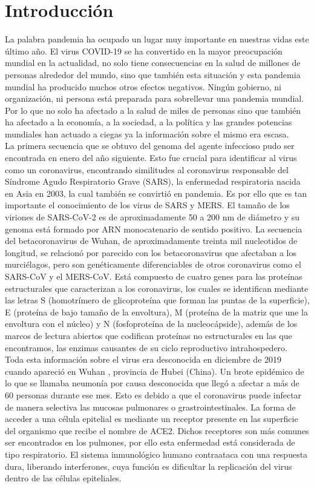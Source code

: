 \documentclass{article}
\begin{document}
\section{Introducción}
		La palabra pandemia ha ocupado un lugar muy importante en nuestras vidas este último año. El virus COVID-19 se ha convertido en la mayor preocupación mundial en la actualidad, no solo tiene consecuencias en la salud de millones de personas alrededor del mundo, sino que también esta situación y esta pandemia mundial ha producido muchos otros efectos negativos. Ningún gobierno, ni organización, ni persona está preparada para sobrellevar una pandemia mundial. Por lo que no solo ha afectado a la salud de miles de personas sino que también ha afectado a la economía, a la sociedad, a la política y las grandes potencias mundiales han actuado a ciegas ya la información sobre el mismo era escasa.\\
		
		\noindent La primera secuencia que se obtuvo del genoma del agente infeccioso pudo ser encontrada en enero del año siguiente. Esto fue crucial para identificar al virus como un coronavirus, encontrando similitudes al coronavirus responsable del Síndrome Agudo Respiratorio Grave (SARS), la enfermedad respiratoria nacida en Asia en 2003, la cual también se convirtió en pandemia. Es por ello que es tan importante el conocimiento de los virus de SARS y MERS. El tamaño de los viriones de SARS-CoV-2 es de aproximadamente 50 a 200 nm de diámetro y su genoma está formado por ARN monocatenario de sentido positivo. La secuencia del betacoronavirus de Wuhan, de aproximadamente treinta mil nucleotidos de longitud, se relacionó por parecido con los betacoronavirus que afectaban a los murciélagos, pero son genéticamente diferenciables de otros coronavirus como el SARS-CoV y el MERS-CoV.  Está compuesto de cuatro genes para las proteínas estructurales que caracterizan a los coronavirus, los cuales se identifican mediante las letras S (homotrímero de glicoproteína que forman las puntas de la superficie), E (proteína de bajo tamaño de la envoltura), M (proteína de la matriz que une la envoltura con el núcleo) y N (fosfoproteína de la nucleocápside), además de los marcos de lectura abiertos que codifican proteínas no estructurales en las que encontramos, las enzimas causantes de su ciclo reproductivo intrahospedero. \\
		
		\noindent Toda esta información sobre el virus era desconocida en diciembre de 2019 cuando apareció en Wuhan , provincia de Hubei (China). Un brote epidémico de lo que se llamaba neumonía por causa desconocida que llegó a afectar a más de 60 personas durante ese mes. Esto es debido a que el coronavirus puede infectar de manera selectiva las mucosas pulmonares o grastrointestinales. La forma de acceder a una célula epitelial es mediante un receptor presente en las superficie del organismo que recibe el nombre de ACE2. Dichos receptores son más comunes ser encontrados en los pulmones, por ello esta enfermedad está considerada de tipo respiratorio. El sistema inmunológico humano contraataca con una respuesta dura, liberando interferones, cuya función es dificultar la replicación del virus dentro de las células epiteliales.\\
		
\end{document}
